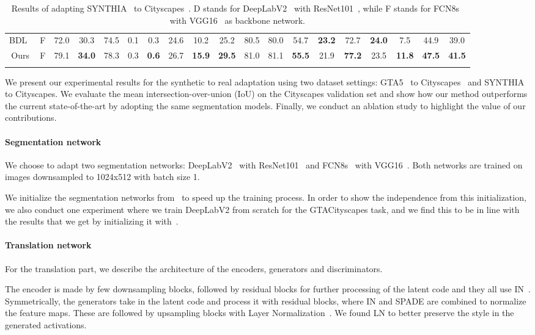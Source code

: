 \documentclass{bmvc2k}
\begin{document}
\begin{table}
{\begin{tabular}{ccccccccccccccccccc}
			BDL~\cite{bdl} & F & 72.0 & 30.3 & 74.5 & 0.1 & 0.3 & 24.6 & 10.2 & 25.2 & 80.5 & 80.0 & 54.7 & \textbf{23.2} & 72.7 & \textbf{24.0} & 7.5 & 44.9 & 39.0 \\
			Ours & F & 79.1 & \textbf{34.0} & 78.3 & 0.3 & \textbf{0.6} & 26.7 & \textbf{15.9} & \textbf{29.5} & 81.0 & 81.1 & \textbf{55.5} & 21.9 & \textbf{77.2} & 23.5 & \textbf{11.8} & \textbf{47.5} & \textbf{41.5} \\
			\hline \\
		\end{tabular}
	}
	\caption{Results of adapting SYNTHIA~\cite{synthia} to Cityscapes~\cite{synthia}. D stands for DeepLabV2~\cite{deeplab} with ResNet101~\cite{resnet}, while F stands for FCN8s~\cite{fcn} with VGG16~\cite{vgg} as backbone network.}
	\label{tab:synthia2cs}
\end{table}

We present our experimental results for the synthetic to real adaptation using two dataset settings: GTA5~\cite{gta} to Cityscapes~\cite{cityscapes} and SYNTHIA~\cite{synthia} to Cityscapes. We evaluate the mean intersection-over-union (IoU) on the Cityscapes validation set and show how our method outperforms the current state-of-the-art by adopting the same segmentation models. Finally, we conduct an ablation study to highlight the value of our contributions.

\paragraph{Segmentation network}
We choose to adapt two segmentation networks: DeepLabV2~\cite{deeplab} with ResNet101~\cite{resnet} and FCN8s~\cite{fcn} with VGG16~\cite{vgg}.  Both networks are trained on images downsampled to 1024x512 with batch size 1.

We initialize the segmentation networks from~\cite{bdl} to speed up the training process. In order to show the independence from this initialization, we also conduct one experiment where we train DeepLabV2 from scratch for the GTACityscapes task, and we find this to be in line with the results that we get by initializing it with~\cite{bdl}.

\paragraph{Translation network}
For the translation part, we describe the architecture of the encoders, generators and discriminators.

The encoder is made by few downsampling blocks, followed by residual blocks for further processing of the latent code and they all use IN~\cite{instancenorm}. Symmetrically, the generators take in the latent code and process it with residual blocks, where IN and SPADE are combined to normalize the feature maps. These are followed by upsampling blocks with Layer Normalization~\cite{layernorm}. We found LN to better preserve the style in the generated activations.
\end{document}
